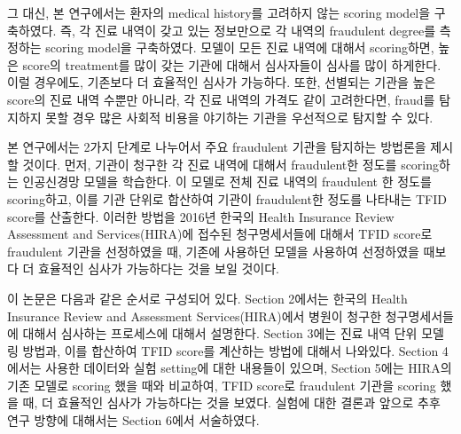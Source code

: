 \documentclass[11pt]{article}           %
\begin{document}
그 대신, 본 연구에서는 환자의 medical history를 고려하지 않는 scoring model을 구축하였다.
즉, 각 진료 내역이 갖고 있는 정보만으로 각 내역의 fraudulent degree를 측정하는 scoring model을 구축하였다.
모델이 모든 진료 내역에 대해서 scoring하면, 높은 score의 treatment를 많이 갖는 기관에 대해서 심사자들이 심사를 많이 하게한다.
이럴 경우에도, 기존보다 더 효율적인 심사가 가능하다.
또한, 선별되는 기관을 높은 score의 진료 내역 수뿐만 아니라, 각 진료 내역의 가격도 같이 고려한다면, fraud를 탐지하지 못할 경우 많은 사회적 비용을 야기하는 기관을 우선적으로 탐지할 수 있다.

본 연구에서는 2가지 단계로 나누어서 주요 fraudulent 기관을 탐지하는 방법론을 제시할 것이다.
먼저, 기관이 청구한 각 진료 내역에 대해서 fraudulent한 정도를 scoring하는 인공신경망 모델을 학습한다.
이 모델로 전체 진료 내역의 fraudulent 한 정도를 scoring하고, 이를 기관 단위로 합산하여 기관이 fraudulent한 정도를 나타내는 TFID score를 산출한다.
이러한 방법을 2016년 한국의 Health Insurance Review Assessment and Services(HIRA)에 접수된 청구명세서들에 대해서 TFID score로 fraudulent 기관을 선정하였을 때, 기존에 사용하던 모델을 사용하여 선정하였을 때보다 더 효율적인 심사가 가능하다는 것을 보일 것이다.

이 논문은 다음과 같은 순서로 구성되어 있다.
Section 2에서는 한국의 Health Insurance Review and Assessment Services(HIRA)에서 병원이 청구한 청구명세서들에 대해서 심사하는 프로세스에 대해서 설명한다.
Section 3에는 진료 내역 단위 모델링 방법과, 이를 합산하여 TFID score를 계산하는 방법에 대해서 나와있다.
Section 4에서는 사용한 데이터와 실험 setting에 대한 내용들이 있으며, Section 5에는 HIRA의 기존 모델로 scoring 했을 때와 비교하여, TFID score로 fraudulent 기관을 scoring 했을 때, 더 효율적인 심사가 가능하다는 것을 보였다.
실험에 대한 결론과 앞으로 추후 연구 방향에 대해서는 Section 6에서 서술하였다. 







\end{document}

